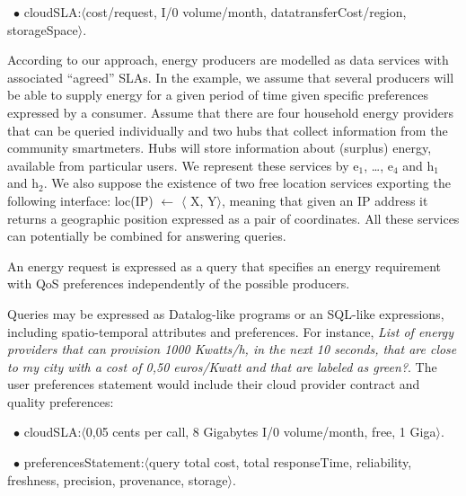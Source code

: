 \begin{trivlist}\sf\footnotesize
% 
 \item[~$\bullet$ ]  {\sf cloudSLA:$\langle$cost/request, I/0 volume/month, datatransferCost/region, storageSpace$\rangle$}. 
 \end{trivlist}
 

According to our approach, energy producers are modelled as data services with associated ``agreed'' SLAs. In the example, we assume that several producers will be able to supply energy for a given period of time given specific  preferences expressed by a consumer. 
Assume that there are four household energy providers that can be queried individually and two hubs that collect information from the community smartmeters.
Hubs will store information about (surplus) energy, available from particular users.
We represent these services by {\sf e$_1$, \dots, e$_4$} and {\sf h$_1$ and h$_2$}.
We also suppose the existence of two free location services exporting the following interface: {\sf loc(IP) $\leftarrow$ $\langle$ X, Y$\rangle$}, meaning that given an IP address it returns a geographic position expressed as a pair of coordinates. 
All these services can potentially be combined for answering queries.



An energy request is expressed as a query that specifies an energy requirement with QoS preferences independently of the possible producers. 

Queries may be expressed as Datalog-like programs or an SQL-like expressions, including spatio-temporal attributes and preferences.
For instance, \textit{List of energy providers that can provision 1000 Kwatts/h, in the next 10 seconds, that are close to my city with a cost of 0,50 euros/Kwatt and that are labeled as green?}. 
The user preferences statement would include their cloud provider contract and quality preferences:

\begin{trivlist}\sf\footnotesize
\item[~$\bullet$ ]  {\sf cloudSLA:$\langle$0,05 cents per call, 8 Gigabytes I/0 volume/month, free, 1 Giga$\rangle$}. 
\item[~$\bullet$ ] {\sf preferencesStatement:$\langle$query total cost,  total responseTime, reliability, freshness, precision, provenance, storage$\rangle$}. 
\end{trivlist}


